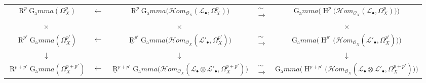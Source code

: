 \begin{cproof}
  \begin{table}[!ht]
    \centering
    \tabcolsep=0mm
    \renewcommand\arraystretch{1.2}
    \begin{tabular}{ccccc}
      \small$\operatorname{R}^p\operatorname{G_a}mma(\Omega_X^p)$           & $\leftarrow$ & \small$\underline{\operatorname{R}}^p\operatorname{G_a}mma\big(\mathcal{H}om_{\mathcal{O}_X}(\mathcal{L}_\bullet,\Omega_X^p)\big)$                                      & $\substack{\sim\\\rightarrow}$ & \small$\operatorname{G_a}mma\big(\operatorname{H}^p\big(\mathcal{H}om_{\mathcal{O}_X}(\mathcal{L}_\bullet,\Omega_X^p)\big)\big)$                                      \\
      $\times$                                               &              & $\times$                                                                                                                                                 &               & $\times$                                                                                                                                               \\
      \small$\operatorname{R}^{p'}\operatorname{G_a}mma(\Omega_X^{p'})$     & $\leftarrow$ & \small$\underline{\operatorname{R}}^{p'}\operatorname{G_a}mma\big(\mathcal{H}om_{\mathcal{O}_X}(\mathcal{L}'_\bullet,\Omega_X^{p'})\big)$                               & $\substack{\sim\\\rightarrow}$ & \small$\operatorname{G_a}mma\big(\operatorname{H}^{p'}\big(\mathcal{H}om_{\mathcal{O}_X}(\mathcal{L}'_\bullet,\Omega_X^{p'})\big)\big)$                              \\
      $\downarrow$                                           &              & $\downarrow$                                                                                                                                             &               & $\downarrow$                                                                                                                                           \\
      \small$\operatorname{R}^{p+p'}\operatorname{G_a}mma(\Omega_X^{p+p'})$ & $\leftarrow$ & \small$\underline{\operatorname{R}}^{p+p'}\operatorname{G_a}mma\big(\mathcal{H}om_{\mathcal{O}_X}(\mathcal{L}_\bullet\otimes\mathcal{L}'_\bullet,\Omega_X^{p+p'})\big)$ & $\substack{\sim\\\rightarrow}$ & \small$\operatorname{G_a}mma\big(\operatorname{H}^{p+p'}\big(\mathcal{H}om_{\mathcal{O}_X}(\mathcal{L}_\bullet\otimes\mathcal{L}'_\bullet,\Omega_X^{p+p'})\big)\big)$
    \end{tabular}
  \end{table}
  \begin{equation}\tag{4.5}\label{fga1-equation-4.5}
    ~
  \end{equation}


\end{cproof}
